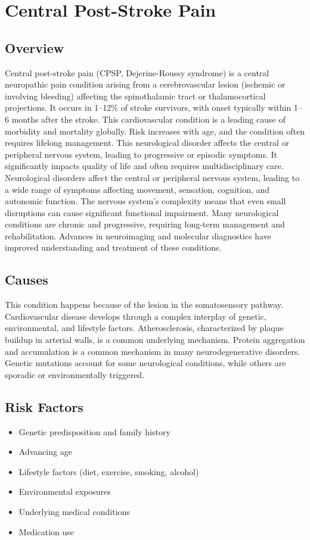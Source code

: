 \chapter{Central Post-Stroke Pain}
\label{sec:Central Post-Stroke Pain}

\section{Overview}
Central post-stroke pain (CPSP, Dejerine-Roussy syndrome) is a central neuropathic pain condition arising from a cerebrovascular lesion (ischemic or involving bleeding) affecting the spinothalamic tract or thalamocortical projections. It occurs in 1--12\% of stroke survivors, with onset typically within 1--6 months after the stroke. This cardiovascular condition is a leading cause of morbidity and mortality globally. Risk increases with age, and the condition often requires lifelong management. This neurological disorder affects the central or peripheral nervous system, leading to progressive or episodic symptoms. It significantly impacts quality of life and often requires multidisciplinary care. Neurological disorders affect the central or peripheral nervous system, leading to a wide range of symptoms affecting movement, sensation, cognition, and autonomic function. The nervous system's complexity means that even small disruptions can cause significant functional impairment. Many neurological conditions are chronic and progressive, requiring long-term management and rehabilitation. Advances in neuroimaging and molecular diagnostics have improved understanding and treatment of these conditions.
\section{Causes}
This condition happens because of the lesion in the somatosensory pathway. Cardiovascular disease develops through a complex interplay of genetic, environmental, and lifestyle factors. Atherosclerosis, characterized by plaque buildup in arterial walls, is a common underlying mechanism.    Protein aggregation and accumulation is a common mechanism in many neurodegenerative disorders.  Genetic mutations account for some neurological conditions, while others are sporadic or environmentally triggered.   
\section{Risk Factors}
\begin{itemize}[noitemsep]
  \item Genetic predisposition and family history
  \item Advancing age
  \item Lifestyle factors (diet, exercise, smoking, alcohol)
  \item Environmental exposures
  \item Underlying medical conditions
  \item Medication use
\end{itemize}
